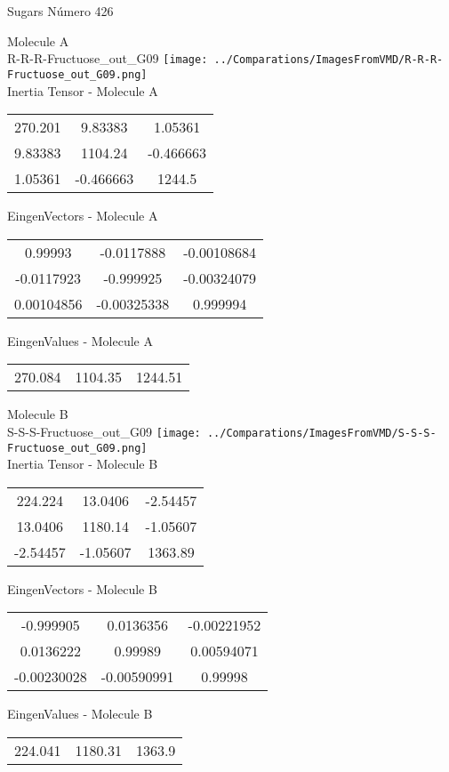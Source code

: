 \vtab[-2cm]
\begin{center}
{\large Sugars \tab Número 426}
\end{center}
\begin{multicols}{2}
\begin{center}

Molecule A \\ 
R-R-R-Fructuose\_out\_G09
\texttt{[image: ../Comparations/ImagesFromVMD/R-R-R-Fructuose\_out\_G09.png]}
\\
Inertia Tensor - Molecule A \\
\vtab

\begin{tabular}{|c c c|}
270.201	 & 	9.83383	 & 	1.05361	 \\
9.83383	 & 	1104.24	 & 	-0.466663	 \\
1.05361	 & 	-0.466663	 & 	1244.5
\end{tabular}

\vtab
 EingenVectors - Molecule A     \\
\vtab
\begin{tabular}{|c c c|}
0.99993	 & 	-0.0117888	 & 	-0.00108684	 \\
-0.0117923	 & 	-0.999925	 & 	-0.00324079	 \\
0.00104856	 & 	-0.00325338	 & 	0.999994
\end{tabular}

\vtab
 EingenValues - Molecule A     \\
\vtab
\begin{tabular}{|c c c|}
270.084	 & 	1104.35	 & 	1244.51	 \\
\end{tabular}
\columnbreak

Molecule B \\ 
S-S-S-Fructuose\_out\_G09
\texttt{[image: ../Comparations/ImagesFromVMD/S-S-S-Fructuose\_out\_G09.png]}
\\
Inertia Tensor - Molecule B \\
\vtab

\begin{tabular}{|c c c|}
224.224	 & 	13.0406	 & 	-2.54457	 \\
13.0406	 & 	1180.14	 & 	-1.05607	 \\
-2.54457	 & 	-1.05607	 & 	1363.89
\end{tabular}

\vtab
 EingenVectors - Molecule B     \\
\vtab
\begin{tabular}{|c c c|}
-0.999905	 & 	0.0136356	 & 	-0.00221952	 \\
0.0136222	 & 	0.99989	 & 	0.00594071	 \\
-0.00230028	 & 	-0.00590991	 & 	0.99998
\end{tabular}

\vtab
 EingenValues - Molecule B     \\
\vtab
\begin{tabular}{|c c c|}
224.041	 & 	1180.31	 & 	1363.9	 \\
\end{tabular}

\end{center}
\end{multicols}
